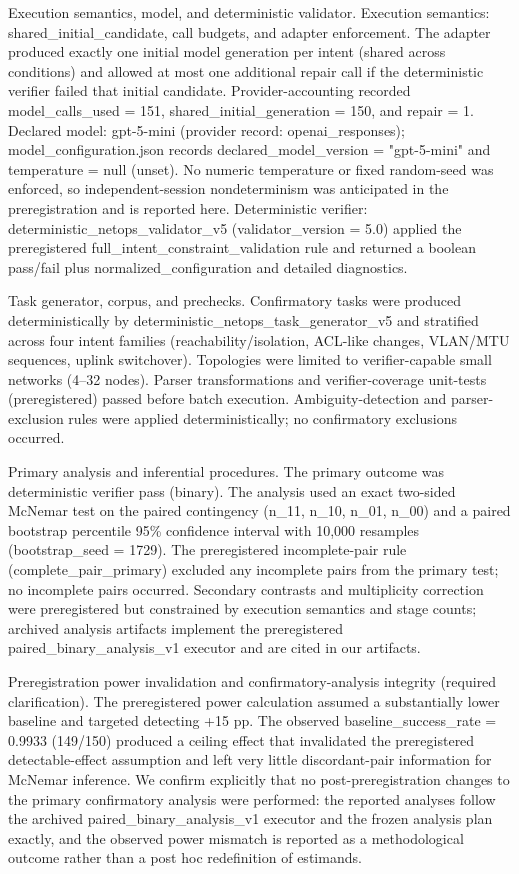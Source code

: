 \documentclass[conference]{IEEEtran}
\begin{document}
Execution semantics, model, and deterministic validator. Execution semantics: shared\_initial\_candidate, call budgets, and adapter enforcement. The adapter produced exactly one initial model generation per intent (shared across conditions) and allowed at most one additional repair call if the deterministic verifier failed that initial candidate. Provider-accounting recorded model\_calls\_used = 151, shared\_initial\_generation = 150, and repair = 1. Declared model: gpt-5-mini (provider record: openai\_responses); model\_configuration.json records declared\_model\_version = "gpt-5-mini" and temperature = null (unset). No numeric temperature or fixed random-seed was enforced, so independent-session nondeterminism was anticipated in the preregistration and is reported here. Deterministic verifier: deterministic\_netops\_validator\_v5 (validator\_version = 5.0) applied the preregistered full\_intent\_constraint\_validation rule and returned a boolean pass/fail plus normalized\_configuration and detailed diagnostics.

Task generator, corpus, and prechecks. Confirmatory tasks were produced deterministically by deterministic\_netops\_task\_generator\_v5 and stratified across four intent families (reachability/isolation, ACL-like changes, VLAN/MTU sequences, uplink switchover). Topologies were limited to verifier-capable small networks (4--32 nodes). Parser transformations and verifier-coverage unit-tests (preregistered) passed before batch execution. Ambiguity-detection and parser-exclusion rules were applied deterministically; no confirmatory exclusions occurred.

Primary analysis and inferential procedures. The primary outcome was deterministic verifier pass (binary). The analysis used an exact two-sided McNemar test on the paired contingency (n\_11, n\_10, n\_01, n\_00) and a paired bootstrap percentile 95\% confidence interval with 10,000 resamples (bootstrap\_seed = 1729). The preregistered incomplete-pair rule (complete\_pair\_primary) excluded any incomplete pairs from the primary test; no incomplete pairs occurred. Secondary contrasts and multiplicity correction were preregistered but constrained by execution semantics and stage counts; archived analysis artifacts implement the preregistered paired\_binary\_analysis\_v1 executor and are cited in our artifacts.

Preregistration power invalidation and confirmatory-analysis integrity (required clarification). The preregistered power calculation assumed a substantially lower baseline and targeted detecting +15 pp. The observed baseline\_success\_rate = 0.9933 (149/150) produced a ceiling effect that invalidated the preregistered detectable-effect assumption and left very little discordant-pair information for McNemar inference. We confirm explicitly that no post-preregistration changes to the primary confirmatory analysis were performed: the reported analyses follow the archived paired\_binary\_analysis\_v1 executor and the frozen analysis plan exactly, and the observed power mismatch is reported as a methodological outcome rather than a post hoc redefinition of estimands.
\end{document}

